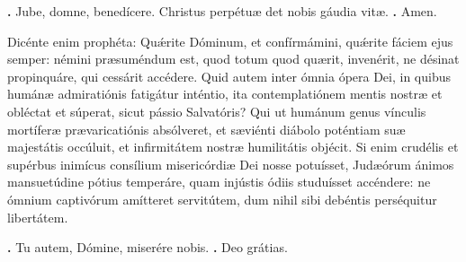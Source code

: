 \begin{small}
\textbf{\Vbar.} Jube, domne, benedícere.
  \hspace{.3em}
Christus perpétuæ det nobis gáudia vitæ. \textbf{\Rbar.} Amen.
\end{small}


Dicénte enim prophéta: Qu\'{\ae}rite Dóminum, et confírmámini, qu\'{\ae}rite fáciem ejus semper: némini præsuméndum est, quod totum quod quærit, invenérit, ne désinat propinquáre, qui cessárit accédere. Quid autem inter ómnia ópera Dei, in quibus humánæ admiratiónis fatigátur inténtio, ita contemplatiónem mentis nostræ et obléctat et súperat, sicut pássio Salvatóris? Qui ut humánum genus vínculis mortíferæ prævaricatiónis absólveret, et sæviénti diábolo poténtiam suæ majestátis occúluit, et infirmitátem nostræ humilitátis objécit. Si enim crudélis et supérbus inimícus consílium misericórdiæ Dei nosse potuísset, Judæórum ánimos mansuetúdine pótius temperáre, quam injústis ódiis studuísset accéndere: ne ómnium captivórum amítteret servitútem, dum nihil sibi debéntis perséquitur libertátem.

\textbf{\Vbar.} Tu autem, Dómine, miserére nobis.
\textbf{\Rbar.} Deo grátias.


